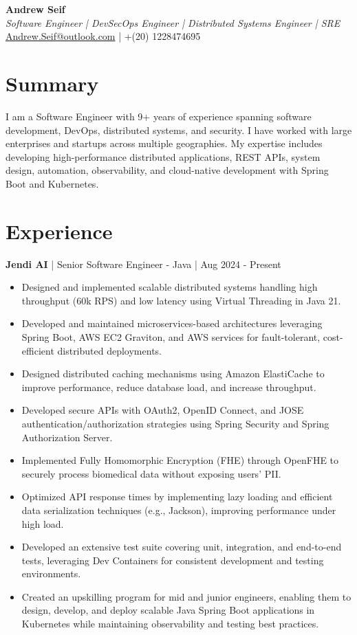 \documentclass[a4paper,10pt]{article}
\begin{document}
\begin{center}
    {\LARGE \textbf{Andrew Seif}}\\
    \textit{Software Engineer | DevSecOps Engineer | Distributed Systems Engineer | SRE}\\
    \href{mailto:Andrew.Seif@outlook.com}{Andrew.Seif@outlook.com} | +(20) 1228474695
\end{center}

\section*{Summary}
I am a Software Engineer with 9+ years of experience spanning software development, DevOps, distributed systems, and security. I have worked with large enterprises and startups across multiple geographies. My expertise includes developing high-performance distributed applications, REST APIs, system design, automation, observability, and cloud-native development with Spring Boot and Kubernetes.

\section*{Experience}
\textbf{Jendi AI} | Senior Software Engineer - Java | Aug 2024 - Present
\begin{itemize}
    \item Designed and implemented scalable distributed systems handling high throughput (60k RPS) and low latency using Virtual Threading in Java 21.
    \item Developed and maintained microservices-based architectures leveraging Spring Boot, AWS EC2 Graviton, and AWS services for fault-tolerant, cost-efficient distributed deployments.
    \item Designed distributed caching mechanisms using Amazon ElastiCache to improve performance, reduce database load, and increase throughput.
    \item Developed secure APIs with OAuth2, OpenID Connect, and JOSE authentication/authorization strategies using Spring Security and Spring Authorization Server.
    \item Implemented Fully Homomorphic Encryption (FHE) through OpenFHE to securely process biomedical data without exposing users' PII.
    \item Optimized API response times by implementing lazy loading and efficient data serialization techniques (e.g., Jackson), improving performance under high load.
    \item Developed an extensive test suite covering unit, integration, and end-to-end tests, leveraging Dev Containers for consistent development and testing environments.
    \item Created an upskilling program for mid and junior engineers, enabling them to design, develop, and deploy scalable Java Spring Boot applications in Kubernetes while maintaining observability and testing best practices.
\end{itemize}
\end{document}
